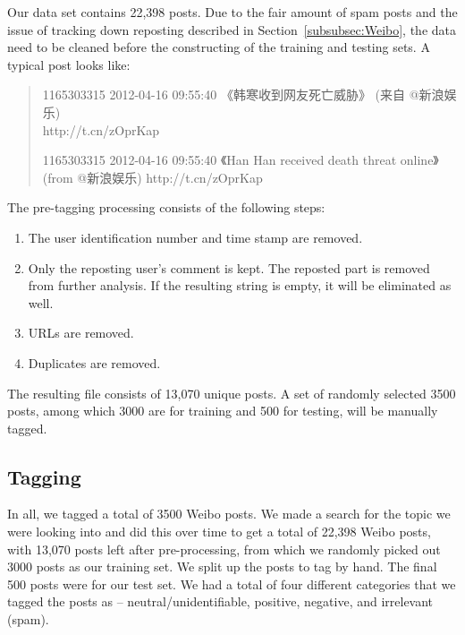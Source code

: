 \documentclass[11pt]{article}
\newcommand{\1}[1]{{\mathbf 1}\left\{#1\right\}}        %
\begin{document}
Our data set contains 22,398 posts. 
Due to the fair amount of spam posts and the issue of tracking down reposting described in Section~\ref{subsubsec:Weibo}, the data need to be cleaned before the constructing of the training and testing sets.
A typical post looks like:
\begin{quote}
1165303315 2012-04-16 09:55:40  《韩寒收到网友死亡威胁》 (来自 @新浪娱乐) \\ 
http://t.cn/zOprKap

1165303315 2012-04-16 09:55:40  《Han Han received death threat online》 (from @新浪娱乐) http://t.cn/zOprKap
\end{quote} 
The pre-tagging processing consists of the following steps:
\begin{enumerate}
\item The user identification number and time stamp are removed.
\item Only the reposting user's comment is kept. The reposted part is removed from further analysis. If the resulting string is empty, it will be eliminated as well.
\item URLs are removed.
\item Duplicates are removed.
\end{enumerate}

The resulting file consists of 13,070 unique posts. A set of randomly selected 3500 posts, among which 3000 are for training and 500 for testing, will be manually tagged.



\subsection{Tagging}


In all, we tagged a total of 3500 Weibo posts.  We made a search for the topic we were looking into and did this over time to get a total of 22,398 Weibo posts, with 13,070 posts left after pre-processing, from which we randomly picked out 3000 posts as our training set.  We split up the posts to tag by hand.  The final 500 posts were for our test set. We had a total of four different categories that we tagged the posts as -- neutral/unidentifiable, positive, negative, and irrelevant (spam).  
\end{document}
